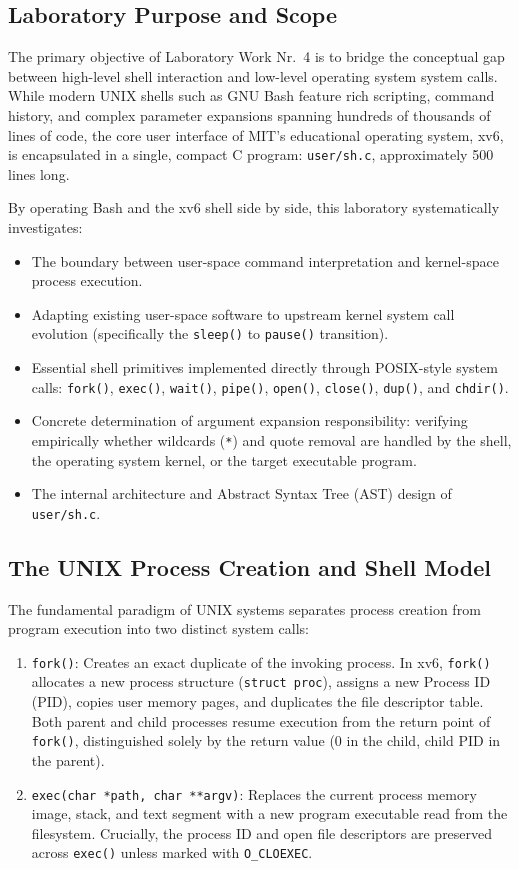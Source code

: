 \documentclass[12pt,a4paper]{article}
\begin{document}
\subsection{Laboratory Purpose and Scope}
The primary objective of Laboratory Work Nr.~4 is to bridge the conceptual gap between high-level shell interaction and low-level operating system system calls. While modern UNIX shells such as GNU Bash feature rich scripting, command history, and complex parameter expansions spanning hundreds of thousands of lines of code, the core user interface of MIT's educational operating system, xv6, is encapsulated in a single, compact C program: \texttt{user/sh.c}, approximately 500 lines long.

By operating Bash and the xv6 shell side by side, this laboratory systematically investigates:
\begin{itemize}
    \item The boundary between user-space command interpretation and kernel-space process execution.
    \item Adapting existing user-space software to upstream kernel system call evolution (specifically the \texttt{sleep()} to \texttt{pause()} transition).
    \item Essential shell primitives implemented directly through POSIX-style system calls: \texttt{fork()}, \texttt{exec()}, \texttt{wait()}, \texttt{pipe()}, \texttt{open()}, \texttt{close()}, \texttt{dup()}, and \texttt{chdir()}.
    \item Concrete determination of argument expansion responsibility: verifying empirically whether wildcards (\texttt{*}) and quote removal are handled by the shell, the operating system kernel, or the target executable program.
    \item The internal architecture and Abstract Syntax Tree (AST) design of \texttt{user/sh.c}.
\end{itemize}

\subsection{The UNIX Process Creation and Shell Model}
The fundamental paradigm of UNIX systems separates process creation from program execution into two distinct system calls:
\begin{enumerate}
    \item \texttt{fork()}: Creates an exact duplicate of the invoking process. In xv6, \texttt{fork()} allocates a new process structure (\texttt{struct proc}), assigns a new Process ID (PID), copies user memory pages, and duplicates the file descriptor table. Both parent and child processes resume execution from the return point of \texttt{fork()}, distinguished solely by the return value ($0$ in the child, child PID in the parent).
    \item \texttt{exec(char *path, char **argv)}: Replaces the current process memory image, stack, and text segment with a new program executable read from the filesystem. Crucially, the process ID and open file descriptors are preserved across \texttt{exec()} unless marked with \texttt{O\_CLOEXEC}.
\end{enumerate}
\end{document}
